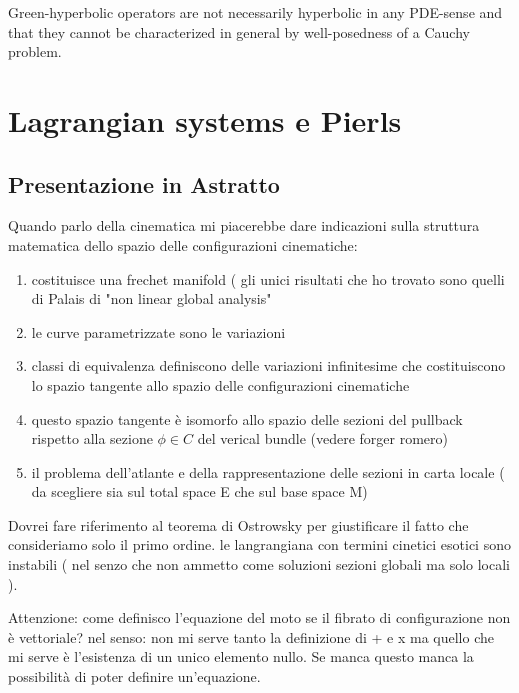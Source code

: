 \documentclass[Main]{subfiles}
\begin{document}
		    Green-hyperbolic operators are not necessarily hyperbolic in any PDE-sense and that they cannot be characterized in general by well-posedness of a Cauchy problem. \cite{Terlaky2010} \cite{Bar2010}
		




\chapter{Lagrangian systems e Pierls}
	\section{Presentazione in Astratto}
		Quando parlo della cinematica mi piacerebbe dare indicazioni sulla struttura matematica dello spazio delle configurazioni cinematiche:
			\begin{enumerate}
				\item costituisce una frechet manifold ( gli unici risultati che ho trovato sono quelli di Palais di "non linear global analysis"
				\item le curve parametrizzate sono le variazioni
				\item classi di equivalenza definiscono delle variazioni infinitesime che costituiscono lo spazio tangente allo spazio delle configurazioni cinematiche
				\item questo spazio tangente è isomorfo allo spazio delle sezioni del pullback rispetto alla sezione $\phi\in C$ del verical bundle (vedere forger romero)
				\item il problema dell'atlante e della rappresentazione delle sezioni in carta locale ( da scegliere sia sul total space E che sul base space M)
			\end{enumerate}
		Dovrei fare riferimento al teorema di Ostrowsky per giustificare il fatto che consideriamo solo il primo ordine. le langrangiana con termini cinetici esotici sono instabili ( nel senzo che non ammetto come soluzioni sezioni globali ma solo locali ).
		
		Attenzione: come definisco l'equazione del moto se il fibrato di configurazione non è vettoriale? nel senso: non mi serve tanto la definizione di + e x ma quello che mi serve è l'esistenza di un unico elemento nullo. Se manca questo manca la possibilità di poter definire un'equazione.
		
\end{document}
